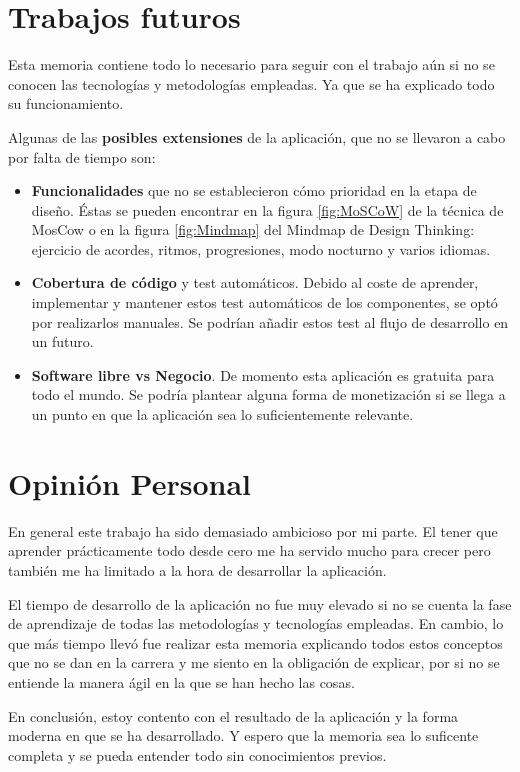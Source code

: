 \documentclass[12pt,twoside,titlepage]{report}
\begin{document}
\section{Trabajos futuros}

Esta memoria contiene todo lo necesario para seguir con el trabajo aún si no se conocen las tecnologías y metodologías empleadas. Ya que se ha explicado todo su funcionamiento.

Algunas de las \textbf{posibles extensiones} de la aplicación, que no se llevaron a cabo por falta de tiempo son:

\begin{itemize}
    \item \textbf{Funcionalidades} que no se establecieron cómo prioridad en la etapa de diseño. Éstas se pueden encontrar en la figura \ref{fig:MoSCoW} de la técnica de MosCow o en la figura \ref{fig:Mindmap} del Mindmap de Design Thinking: ejercicio de acordes, ritmos, progresiones, modo nocturno y varios idiomas.
    \item \textbf{Cobertura de código} y test automáticos. Debido al coste de aprender, implementar y mantener estos test automáticos de los componentes, se optó por realizarlos manuales. Se podrían añadir estos test al flujo de desarrollo en un futuro.
    \item \textbf{Software libre vs Negocio}. De momento esta aplicación es gratuita para todo el mundo. Se podría plantear alguna forma de monetización si se llega a un punto en que la aplicación sea lo suficientemente relevante.
\end{itemize}

\section{Opinión Personal}
En general este trabajo ha sido demasiado ambicioso por mi parte. El tener que aprender prácticamente todo desde cero me ha servido mucho para crecer pero también me ha limitado a la hora de desarrollar la aplicación.

El tiempo de desarrollo de la aplicación no fue muy elevado si no se cuenta la fase de aprendizaje de todas las metodologías y tecnologías empleadas. En cambio, lo que más tiempo llevó fue realizar esta memoria explicando todos estos conceptos que no se dan en la carrera y me siento en la obligación de explicar, por si no se entiende la manera ágil en la que se han hecho las cosas.

En conclusión, estoy contento con el resultado de la aplicación y la forma moderna en que se ha desarrollado. Y espero que la memoria sea lo suficente completa y se pueda entender todo sin conocimientos previos.
\end{document}
